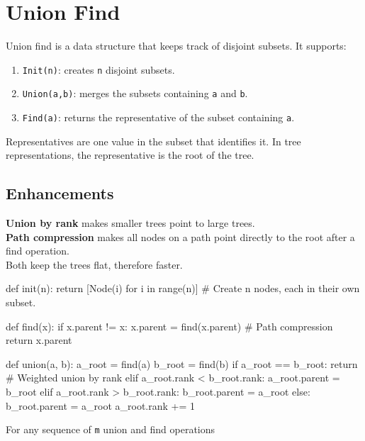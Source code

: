 \section{Union Find}
Union find is a data structure that keeps track of disjoint subsets. It supports:
\begin{enumerate}
    \item \verb|Init(n)|: creates \verb|n| disjoint subsets.
    \item \verb|Union(a,b)|: merges the subsets containing \verb|a| and \verb|b|.
    \item \verb|Find(a)|: returns the representative of the subset containing \verb|a|.
\end{enumerate}

Representatives are one value in the subset that identifies it. In tree representations, the representative is the root of the tree.

\subsection{Enhancements}
\textbf{Union by rank} makes smaller trees point to large trees. \\
\textbf{Path compression} makes all nodes on a path point directly to the root after a find operation. \\
Both keep the trees flat, therefore faster.


\begin{python}
def init(n):
    return [Node(i) for i in range(n)] # Create n nodes, each in their own subset.

def find(x):
    if x.parent != x:
        x.parent = find(x.parent) # Path compression
    return x.parent

def union(a, b):
    a_root = find(a)
    b_root = find(b)
    if a_root == b_root:
        return
    # Weighted union by rank
    elif a_root.rank < b_root.rank:
        a_root.parent = b_root
    elif a_root.rank > b_root.rank:
        b_root.parent = a_root
    else:
        b_root.parent = a_root
        a_root.rank += 1
\end{python}

For any sequence of \verb|m| union and find operations 